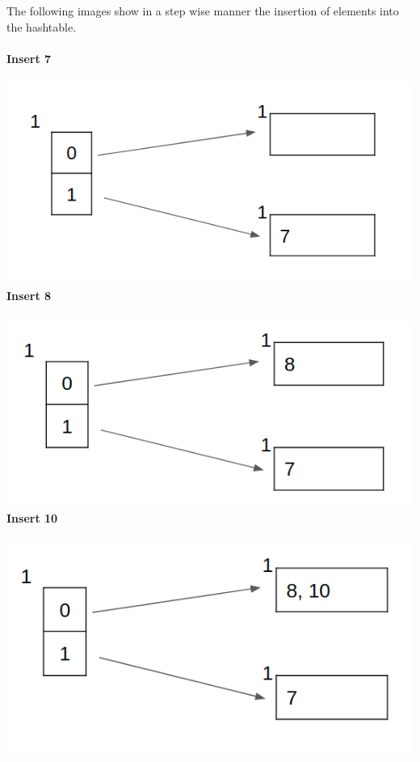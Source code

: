 \documentclass[12pt]{article}
\begin{document}
\begin{enumerate}
The following images show in a step wise manner the insertion of elements into the hashtable.\\\\
\textbf{Insert 7}\\\\
\includegraphics[scale=0.53]{51a.png}\\
\textbf{Insert 8}\\\\
\includegraphics[scale=0.53]{51b.png}\\
\textbf{Insert 10}\\\\
\includegraphics[scale=0.53]{52a.png}\\

\end{enumerate}
\end{document}
